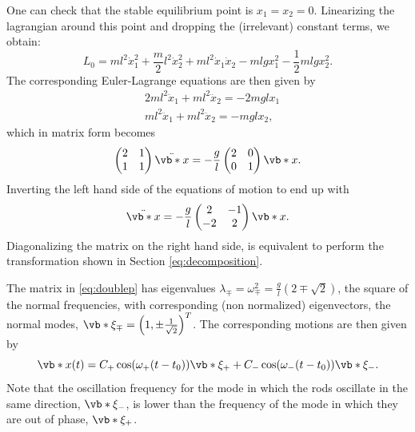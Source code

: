 \documentclass[english,fontsize=11pt,paper=b5]{scrbook}
\numberwithin{equation}{chapter}
\theoremstyle{definition}
\begin{document}
    One can check that the stable equilibrium point is $x_1 = x_2 = 0$.
    Linearizing the lagrangian around this point and dropping the (irrelevant) constant terms, we obtain:
    \begin{equation}
      L_0 = m l^2 \dot x_1^2
      + \frac m2 l^2 \dot x_2^2
      + m l^2 \dot x_1 \dot x_2
      - ml g x_1^2
      - \frac12 mlg x_2^2.
    \end{equation}
    The corresponding Euler-Lagrange equations are then given by
    \begin{align}
   & 2ml^2 \ddot x_1 + ml^2 \ddot x_2 = -2mgl x_1 \\
   & ml^2 \ddot x_1 + ml^2 \ddot x_2 = -mgl x_2,
    \end{align}
    which in matrix form becomes
    \begin{equation}
      \begin{pmatrix}2&1\\1&1\end{pmatrix} \ddot{\vb*{x}}
      = - \frac gl \begin{pmatrix}2&0\\0&1\end{pmatrix} \vb*{x}.
    \end{equation}
    Inverting the left hand side of the equations of motion to end up with
    \begin{equation}\label{eq:doublep}
      \ddot{\vb*{x}} = - \frac gl \begin{pmatrix}2&-1\\-2&2\end{pmatrix} \vb*{x}.
    \end{equation}
    Diagonalizing the matrix on the right hand side, is equivalent to perform the transformation shown in Section \ref{eq:decomposition}.

    The matrix in \eqref{eq:doublep} has eigenvalues $\lambda_\mp = \omega_\mp^2 = \frac{g}l \left(2\mp \sqrt{2}\right)$, the square of the normal frequencies, with corresponding (non normalized) eigenvectors, the normal modes, $\vb*{\xi}_\mp = \left(1, \pm \frac1{\sqrt{2}}\right)^T$.
    The corresponding motions are then given by
    \begin{equation}
      \vb*{x}(t) = C_+  \cos (\omega_+ (t - t_0)) \vb*{\xi}_+ + C_- \cos (\omega_- (t - t_0)) \vb*{\xi}_-.
    \end{equation}
    Note that the oscillation frequency for the mode in which the rods oscillate in the same direction, $\vb*{\xi}_-$, is lower than the frequency of the mode in which they are out of phase, $\vb*{\xi}_+$.
\end{document}
